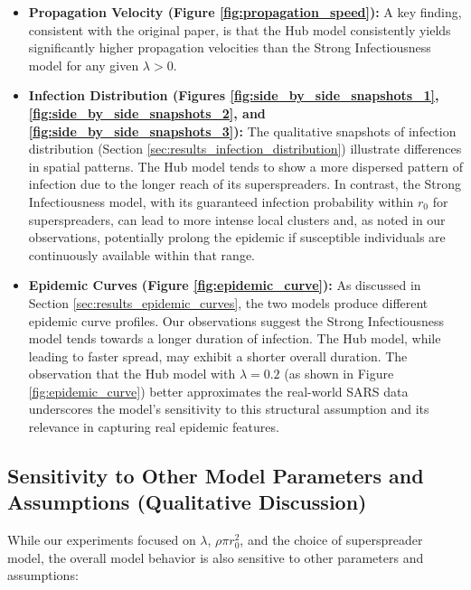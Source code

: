 \documentclass{article}
\begin{document}
\begin{itemize}
    \item \textbf{Propagation Velocity (Figure \ref{fig:propagation_speed}):}
    A key finding, consistent with the original paper, is that the Hub model consistently yields significantly higher propagation velocities than the Strong Infectiousness model for any given $\lambda > 0$.

    \item \textbf{Infection Distribution (Figures \ref{fig:side_by_side_snapshots_1}, \ref{fig:side_by_side_snapshots_2}, and \ref{fig:side_by_side_snapshots_3}):}
    The qualitative snapshots of infection distribution (Section \ref{sec:results_infection_distribution}) illustrate differences in spatial patterns. The Hub model tends to show a more dispersed pattern of infection due to the longer reach of its superspreaders. In contrast, the Strong Infectiousness model, with its guaranteed infection probability within $r_0$ for superspreaders, can lead to more intense local clusters and, as noted in our observations, potentially prolong the epidemic if susceptible individuals are continuously available within that range.

    \item \textbf{Epidemic Curves (Figure \ref{fig:epidemic_curve}):}
    As discussed in Section \ref{sec:results_epidemic_curves}, the two models produce different epidemic curve profiles. Our observations suggest the Strong Infectiousness model tends towards a longer duration of infection. The Hub model, while leading to faster spread, may exhibit a shorter overall duration. The observation that the Hub model with $\lambda=0.2$ (as shown in Figure \ref{fig:epidemic_curve}) better approximates the real-world SARS data underscores the model's sensitivity to this structural assumption and its relevance in capturing real epidemic features.
\end{itemize}

\subsection{Sensitivity to Other Model Parameters and Assumptions (Qualitative Discussion)}
\label{sec:sensitivity_other}

While our experiments focused on $\lambda$, $\rho\pi r_0^2$, and the choice of superspreader model, the overall model behavior is also sensitive to other parameters and assumptions:
\end{document}
